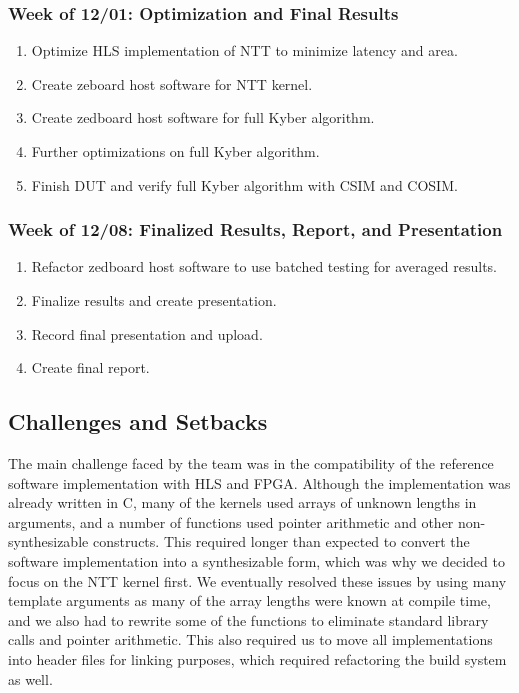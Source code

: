 \subsubsection*{Week of 12/01: Optimization and Final Results}
\begin{enumerate}
  \item Optimize HLS implementation of NTT to minimize latency and area. \hfill \texttt{}
  \item Create zeboard host software for NTT kernel. \hfill \texttt{}
  \item Create zedboard host software for full Kyber algorithm. \hfill \texttt{}
  \item Further optimizations on full Kyber algorithm. \hfill \texttt{}
  \item Finish DUT and verify full Kyber algorithm with CSIM and COSIM. \hfill \texttt{}
\end{enumerate}
\subsubsection*{Week of 12/08: Finalized Results, Report, and Presentation}
\begin{enumerate}
  \item Refactor zedboard host software to use batched testing for averaged results. \hfill \texttt{}
  \item Finalize results and create presentation. \hfill \texttt{}
  \item Record final presentation and upload. \hfill \texttt{}
  \item Create final report. \hfill \texttt{}
\end{enumerate}

\subsection*{Challenges and Setbacks}
The main challenge faced by the team was in the compatibility of the reference software implementation with HLS and FPGA. Although the implementation was already written in C, many of the kernels used arrays of unknown lengths in arguments, and a number of functions used pointer arithmetic and other non-synthesizable constructs. This required longer than expected to convert the software implementation into a synthesizable form, which was why we decided to focus on the NTT kernel first. We eventually resolved these issues by using many template arguments as many of the array lengths were known at compile time, and we also had to rewrite some of the functions to eliminate standard library calls and pointer arithmetic. This also required us to move all implementations into header files for linking purposes, which required refactoring the build system as well.

